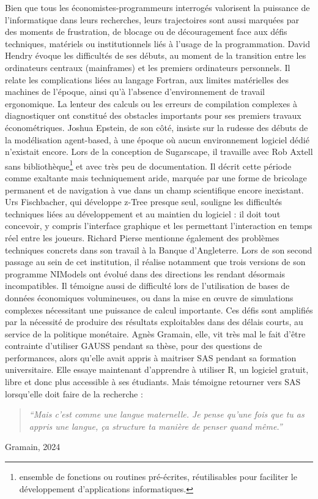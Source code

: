 Bien que tous les économistes-programmeurs interrogés valorisent la puissance de l’informatique dans leurs recherches, leurs trajectoires sont aussi marquées par des moments de frustration, de blocage ou de découragement face aux défis techniques, matériels ou institutionnels liés à l’usage de la programmation. David Hendry évoque les difficultés de ses débuts, au moment de la transition entre les ordinateurs centraux (mainframes) et les premiers ordinateurs personnels. Il relate les complications liées au langage Fortran, aux limites matérielles des machines de l’époque, ainsi qu’à l’absence d’environnement de travail ergonomique. La lenteur des calculs ou les erreurs de compilation complexes à diagnostiquer ont constitué des obstacles importants pour ses premiers travaux économétriques. Joshua Epstein, de son côté, insiste sur la rudesse des débuts de la modélisation agent-based, à une époque où aucun environnement logiciel dédié n’existait encore. Lors de la conception de Sugarscape, il travaille avec Rob Axtell sans bibliothèque\footnote{ensemble de fonctions ou routines pré-écrites, réutilisables pour faciliter le développement d'applications informatiques.} et avec très peu de documentation. Il décrit cette période comme exaltante mais techniquement aride, marquée par une forme de bricolage permanent et de navigation à vue dans un champ scientifique encore inexistant. Urs Fischbacher, qui développe z-Tree presque seul, souligne les difficultés techniques liées au développement et au maintien du logiciel : il doit tout concevoir, y compris l’interface graphique et les permettant l’interaction en temps réel entre les joueurs. Richard Pierse mentionne également des problèmes techniques concrets dans son travail à la Banque d’Angleterre. Lors de son second passage au sein de cet institution, il réalise notamment que trois versions de son programme NIModels ont évolué dans des directions les rendant désormais incompatibles. Il témoigne aussi de difficulté lors de l’utilisation de bases de données économiques volumineuses, ou dans la mise en œuvre de simulations complexes nécessitant une puissance de calcul importante. Ces défis sont amplifiés par la nécessité de produire des résultats exploitables dans des délais courts, au service de la politique monétaire. 
Agnès Gramain, elle, vit très mal le fait d'être contrainte d’utiliser GAUSS pendant sa thèse, pour des questions de performances, alors qu'elle avait appris à maitriser SAS pendant sa formation universitaire. Elle essaye maintenant d'apprendre à utiliser R, un logiciel gratuit, libre et donc plus accessible à ses étudiants. Mais témoigne retourner vers SAS lorsqu'elle doit faire de la recherche : 
\begin{quote}
\begin{center}
\textit{``Mais c’est comme une langue maternelle. Je pense qu’une fois que tu as appris une langue, ça structure ta manière de penser quand même.''}
\end{center}
\end{quote} \hfill Gramain, 2024\cite{gramainInterviewAgnesGramain2024}

